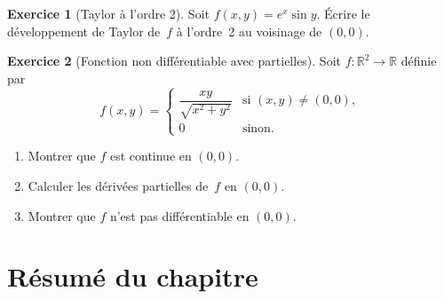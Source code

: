 \documentclass[12pt,a4paper,openany]{book}
\theoremstyle{definition}
\newtheorem{exercice}{Exercice}[chapter]
\newcommand{\R}{\mathbb{R}}
\begin{document}
\begin{exercice}[Taylor à l'ordre 2]
  \label{exo:taylor-2}
  Soit $f(x,y) = e^x \sin y$. Écrire le développement de Taylor de~$f$ à l'ordre~2 au voisinage de $(0, 0)$.
\end{exercice}

\begin{exercice}[Fonction non différentiable avec partielles]
  \label{exo:non-diff-partielles}
  Soit $f \colon \R^2 \to \R$ définie par
  \[
    f(x,y) = \begin{cases} \dfrac{xy}{\sqrt{x^2+y^2}} & \text{si } (x,y) \neq (0,0), \\ 0 & \text{sinon.} \end{cases}
  \]
  \begin{enumerate}[label=(\alph*)]
    \item Montrer que $f$ est continue en $(0,0)$.
    \item Calculer les dérivées partielles de~$f$ en $(0,0)$.
    \item Montrer que $f$ n'est pas différentiable en $(0,0)$.
  \end{enumerate}
\end{exercice}

\section*{Résumé du chapitre}
\end{document}
